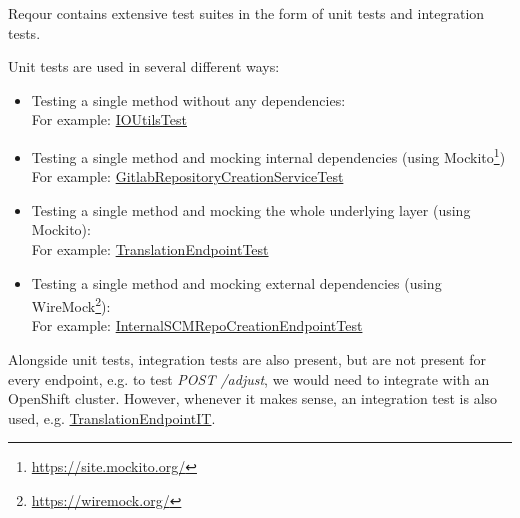\documentclass[../main.tex]{subfiles}
\begin{document}
Reqour contains extensive test suites in the form of unit tests and integration tests.

Unit tests are used in several different ways:
\begin{itemize}
    \item Testing a single method without any dependencies:\\
    For example: \href{https://github.com/project-ncl/reqour/blob/akridl-thesis/core/src/test/java/org/jboss/pnc/reqour/common/utils/IOUtilsTest.java}{IOUtilsTest}

    \item Testing a single method and mocking internal dependencies (using Mockito\footnote{\url{https://site.mockito.org/}})\\
    For example: \href{https://github.com/project-ncl/reqour/blob/akridl-thesis/core/src/test/java/org/jboss/pnc/reqour/service/GitlabRepositoryCreationServiceTest.java}{GitlabRepositoryCreationServiceTest}

    \item Testing a single method and mocking the whole underlying layer (using Mockito):\\
    For example: \href{https://github.com/project-ncl/reqour/blob/akridl-thesis/rest/src/test/java/org/jboss/pnc/reqour/rest/endpoints/TranslationEndpointTest.java}{TranslationEndpointTest}

    \item Testing a single method and mocking external dependencies (using WireMock\footnote{\url{https://wiremock.org/}}):\\
    For example: \href{https://github.com/project-ncl/reqour/blob/akridl-thesis/rest/src/test/java/org/jboss/pnc/reqour/rest/endpoints/InternalSCMRepoCreationEndpointTest.java}{InternalSCMRepoCreationEndpointTest}
\end{itemize}

Alongside unit tests, integration tests are also present, but are not present for every endpoint, e.g. to test \textit{POST /adjust}, we would need to integrate with an OpenShift cluster. However, whenever it makes sense, an integration test is also used, e.g. \href{https://github.com/project-ncl/reqour/blob/akridl-thesis/rest/src/test/java/org/jboss/pnc/reqour/rest/endpoints/TranslationEndpointIT.java}{TranslationEndpointIT}.
\end{document}
